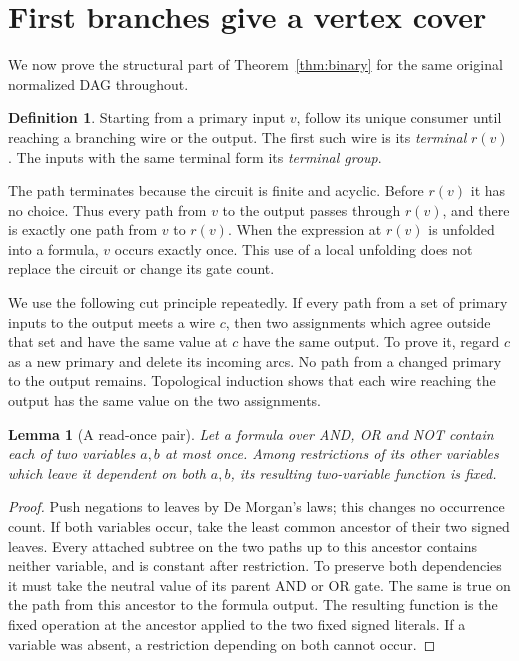 \documentclass[11pt]{article}
\newtheorem{lemma}[theorem]{Lemma}
\theoremstyle{definition}
\newtheorem{definition}[theorem]{Definition}
\theoremstyle{remark}
\begin{document}
\section{First branches give a vertex cover}

We now prove the structural part of Theorem~\ref{thm:binary} for the same
original normalized DAG throughout.

\begin{definition}
Starting from a primary input $v$, follow its unique consumer until reaching
a branching wire or the output. The first such wire is its
\emph{terminal} $r(v)$. The inputs with the same terminal form its
\emph{terminal group}.
\end{definition}

The path terminates because the circuit is finite and acyclic. Before
$r(v)$ it has no choice. Thus every path from $v$ to the output passes
through $r(v)$, and there is exactly one path from $v$ to $r(v)$.
When the expression at $r(v)$ is unfolded into a formula, $v$ occurs
exactly once. This use of a local unfolding does not replace the circuit
or change its gate count.

We use the following cut principle repeatedly. If every path from a set
of primary inputs to the output meets a wire $c$, then two assignments
which agree outside that set and have the same value at $c$ have the same
output. To prove it, regard $c$ as a new primary and delete its incoming
arcs. No path from a changed primary to the output remains. Topological
induction shows that each wire reaching the output has the same value on
the two assignments.

\begin{lemma}[A read-once pair]\label{lem:pair}
Let a formula over AND, OR and NOT contain each of two variables $a,b$
at most once. Among restrictions of its other variables which leave it
dependent on both $a,b$, its resulting two-variable function is fixed.
\end{lemma}
\begin{proof}
Push negations to leaves by De Morgan's laws; this changes no occurrence
count. If both variables occur, take the least common ancestor of their
two signed leaves. Every attached subtree on the two paths up to this
ancestor contains neither variable, and is constant after restriction.
To preserve both dependencies it must take the neutral value of its
parent AND or OR gate. The same is true on the path from this ancestor
to the formula output. The resulting function is the fixed operation at
the ancestor applied to the two fixed signed literals. If a variable was
absent, a restriction depending on both cannot occur.
\end{proof}
\end{document}
